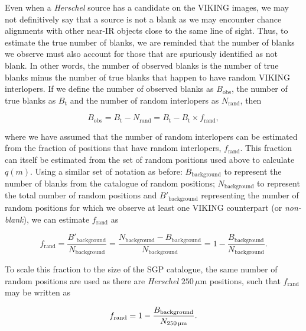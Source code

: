 Even when a \textit{Herschel} source has a candidate on the VIKING images, we may not definitively say that a source is not a blank as we may encounter chance alignments with other near-IR objects close to the same line of sight. Thus, to estimate the true number of blanks, we are reminded that the number of blanks we observe must also account for those that are spuriously identified as not blank. In other words, the number of observed blanks is the number of true blanks minus the number of true blanks that happen to have random VIKING interlopers. If we define the number of observed blanks as $B_{\textrm{obs}}$, the number of true blanks as $B_{\textrm{t}}$ and the number of random interlopers as $N_{\textrm{rand}}$, then

\begin{equation}
    B_{\textrm{obs}} = B_{\textrm{t}} - N_{\textrm{rand}} = B_{\textrm{t}} - B_{\textrm{t}} \times f_{\textrm{rand}},
    \label{eq:observed_blanks}
\end{equation}

\noindent where we have assumed that the number of random interlopers can be estimated from the fraction of positions that have random interlopers, $f_{\textrm{rand}}$. This fraction can itself be estimated from the set of random positions used above to calculate $q(m)$. Using a similar set of notation as before: $B_{\textrm{background}}$ to represent the number of blanks from the catalogue of random positions; $N_{\textrm{background}}$ to represent the total number of random positions and $B'_{\textrm{background}}$ representing the number of random positions for which we observe at least one VIKING counterpart (or \textit{non-blank}), we can estimate $f_{\textrm{rand}}$ as

\begin{equation}
    f_{\textrm{rand}} = \frac{B'_{\textrm{background}}}{N_{\textrm{background}}} = \frac{N_{\textrm{background}} - B_{\textrm{background}}}{N_{\textrm{background}}} = 1 - \frac{B_{\textrm{background}}}{N_{\textrm{background}}}.
\end{equation}

To scale this fraction to the size of the SGP catalogue, the same number of random positions are used as there are \textit{Herschel} $250\,\mu$m positions, such that $f_{\textrm{rand}}$ may be written as

\begin{equation}
    f_{\textrm{rand}} = 1 - \frac{B_{\textrm{background}}}{N_{\textrm{250\,\micron}}}.
\end{equation}

